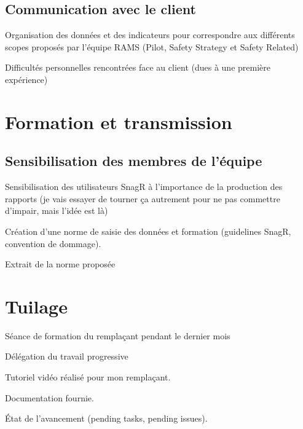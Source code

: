 \subsection{Communication avec le client}

Organisation des données et des indicateurs pour correspondre aux différents scopes proposés par l'équipe RAMS (Pilot, Safety Strategy et Safety Related)

Difficultés personnelles rencontrées face au client (dues à une première expérience)

\newpage
\section{Formation et transmission}
\subsection{Sensibilisation des membres de l'équipe }
Sensibilisation des utilisateurs SnagR à l'importance de la production des rapports (je vais essayer de tourner ça autrement pour ne pas commettre d'impair, mais l'idée est là)

Création d'une norme de saisie des données et formation (guidelines SnagR, convention de dommage).

Extrait de la norme proposée

\section{Tuilage}

Séance de formation du remplaçant pendant le dernier mois

Délégation du travail progressive

Tutoriel vidéo réalisé pour mon remplaçant.

Documentation fournie.

État de l'avancement (pending tasks, pending issues).
